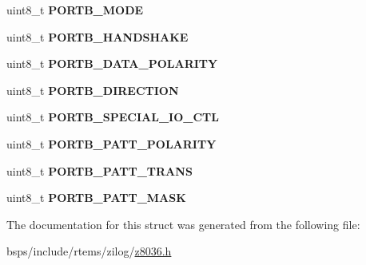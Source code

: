 \begin{DoxyCompactItemize}
uint8\+\_\+t {\bfseries P\+O\+R\+T\+B\+\_\+\+M\+O\+DE}
\item 
\mbox{\label{structz8036__map_a9917f2ef42ad05267fb55aabd3208136}} 
uint8\+\_\+t {\bfseries P\+O\+R\+T\+B\+\_\+\+H\+A\+N\+D\+S\+H\+A\+KE}
\item 
\mbox{\label{structz8036__map_acfd8ae4f2a5df343a67f5dec5fc33ab3}} 
uint8\+\_\+t {\bfseries P\+O\+R\+T\+B\+\_\+\+D\+A\+T\+A\+\_\+\+P\+O\+L\+A\+R\+I\+TY}
\item 
\mbox{\label{structz8036__map_abc9be26a63fdddb9b51cb0e5fe8ba54c}} 
uint8\+\_\+t {\bfseries P\+O\+R\+T\+B\+\_\+\+D\+I\+R\+E\+C\+T\+I\+ON}
\item 
\mbox{\label{structz8036__map_a586f75b2ce8b7cee210f856e02d4f7d2}} 
uint8\+\_\+t {\bfseries P\+O\+R\+T\+B\+\_\+\+S\+P\+E\+C\+I\+A\+L\+\_\+\+I\+O\+\_\+\+C\+TL}
\item 
\mbox{\label{structz8036__map_afd12ca95d485761c71622bbd9305102d}} 
uint8\+\_\+t {\bfseries P\+O\+R\+T\+B\+\_\+\+P\+A\+T\+T\+\_\+\+P\+O\+L\+A\+R\+I\+TY}
\item 
\mbox{\label{structz8036__map_ae6a5464e510f0ae7328a403b02d38f69}} 
uint8\+\_\+t {\bfseries P\+O\+R\+T\+B\+\_\+\+P\+A\+T\+T\+\_\+\+T\+R\+A\+NS}
\item 
\mbox{\label{structz8036__map_a6193da93de048bcea7858b69609bb871}} 
uint8\+\_\+t {\bfseries P\+O\+R\+T\+B\+\_\+\+P\+A\+T\+T\+\_\+\+M\+A\+SK}
\end{DoxyCompactItemize}


The documentation for this struct was generated from the following file\+:\begin{DoxyCompactItemize}
\item 
bsps/include/rtems/zilog/\mbox{\hyperlink{z8036_8h}{z8036.\+h}}\end{DoxyCompactItemize}
